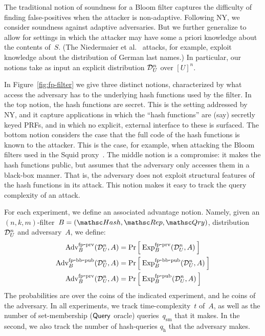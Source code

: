  
The traditional notion of soundness for a Bloom filter captures the difficulty of finding false-positives when the attacker is non-adaptive.  Following NY, we consider soundness against adaptive adversaries.  But we further generalize to allow for settings in which the attacker may have some a priori knowledge about the contents of~$S$. (The Niedermaier et al.~\cite{xxx} attacks, for example, exploit knowledge about the distribution of German last names.)   In particular, our notions take as input an explicit distribution $\mathcal{D}_{U}^{n}$ over $[U]^n$.


In Figure~\ref{fig:fp-filter} we give three distinct notions, characterized by what access the adversary has to the underlying hash functions used by the filter.  In the top notion, the hash functions are secret.  This is the setting addressed by NY, and it capture applications in which the ``hash functions'' are (say) secretly keyed PRFs, and in which no explicit, external interface to these is surfaced.
%
The bottom notion considers the case that the full code of the hash functions is known to the attacker.  This is the case, for example, when attacking the Bloom filters used in the Squid proxy~\cite{xxx}.
%
The middle notion is a compromise: it makes the hash functions public, but assumes that the adversary only accesses them in a black-box manner.  That is, the adversary does not exploit structural features of the hash functions in its attack.  This notion makes it easy to track the query complexity of an attack.

For each experiment, we define an associated advantage notion.  Namely, given an $(n,k,m)$-filter~$B=(\Hash,\Rep,\Qry)$, distribution~$\mathcal{D}_{U}^{n}$ and adversary~$A$, we define:
\begin{align*}
\mathrm{Adv}^{\mathrm{fp\mbox{-}prv}}_{B}(\mathcal{D}_{U}^{n},A) &= \Pr\left[\: \mathrm{Exp}^{\mathrm{fp\mbox{-}prv}}_{B}(\mathcal{D}_{U}^{n},A) \:\right] \\
\mathrm{Adv}^{\mathrm{fp\mbox{-}bb\mbox{-}pub}}_{B}(\mathcal{D}_{U}^{n},A) &= \Pr\left[\: \mathrm{Exp}^{\mathrm{fp\mbox{-}bb\mbox{-}pub}}_{B}(\mathcal{D}_{U}^{n},A) \:\right] \\
\mathrm{Adv}^{\mathrm{fp\mbox{-}prv}}_{B}(\mathcal{D}_{U}^{n},A) &= \Pr\left[\: \mathrm{Exp}^{\mathrm{fp\mbox{-}pub}}_{B}(\mathcal{D}_{U}^{n},A) \:\right]
\end{align*}
The probabilities are over the coins of the indicated experiment, and he coins of the adversary.   In all experiments, we track time-complexity~$t$ of~$A$, as well as the number of set-membership ($\mathsf{Query}$ oracle) queries~$q_{\mathrm{sm}}$ that it makes.   In the second, we also track the number of hash-queries $q_{\mathrm{h}}$ that the adversary makes.


